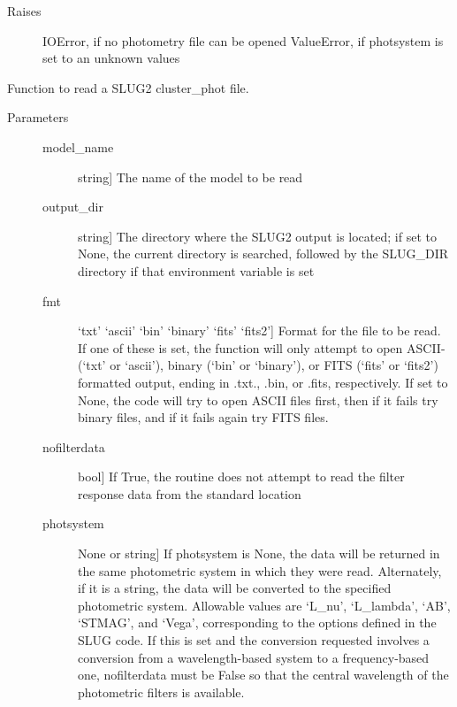 \documentclass[letterpaper,10pt,english]{sphinxmanual}
\begin{document}
\begin{fulllineitems}
\begin{description}
\begin{description}
\end{description}

\item[{Raises}] \leavevmode
IOError, if no photometry file can be opened
ValueError, if photsystem is set to an unknown values

\end{description}

\end{fulllineitems}


\begin{fulllineitems}
\label{slugpy:slugpy.read_cluster_phot}
Function to read a SLUG2 cluster\_phot file.
\begin{description}
\item[{Parameters}] \leavevmode\begin{description}
\item[{model\_name}] \leavevmode{[}string{]}
The name of the model to be read

\item[{output\_dir}] \leavevmode{[}string{]}
The directory where the SLUG2 output is located; if set to None,
the current directory is searched, followed by the SLUG\_DIR
directory if that environment variable is set

\item[{fmt}] \leavevmode{[}`txt' \textbar{} `ascii' \textbar{} `bin' \textbar{} `binary' \textbar{} `fits' \textbar{} `fits2'{]}
Format for the file to be read. If one of these is set, the
function will only attempt to open ASCII-(`txt' or `ascii'), 
binary (`bin' or `binary'), or FITS (`fits' or `fits2')
formatted output, ending in .txt., .bin, or .fits,
respectively. If set to None, the code will try to open
ASCII files first, then if it fails try binary files, and if
it fails again try FITS files.

\item[{nofilterdata}] \leavevmode{[}bool{]}
If True, the routine does not attempt to read the filter
response data from the standard location

\item[{photsystem}] \leavevmode{[}None or string{]}
If photsystem is None, the data will be returned in the same
photometric system in which they were read. Alternately, if it
is a string, the data will be converted to the specified
photometric system. Allowable values are `L\_nu', `L\_lambda',
`AB', `STMAG', and `Vega', corresponding to the options defined
in the SLUG code. If this is set and the conversion requested
involves a conversion from a wavelength-based system to a
frequency-based one, nofilterdata must be False so that the
central wavelength of the photometric filters is available.


\end{description}
\end{description}
\end{fulllineitems}
\end{document}
